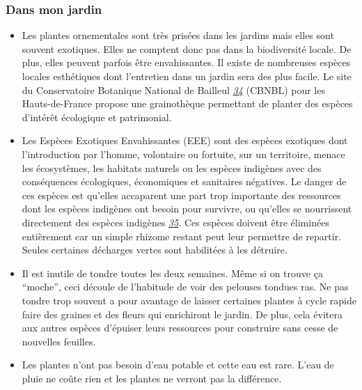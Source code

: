 \hypertarget{dans-mon-jardin}{%
\subsubsection{Dans mon jardin}\label{dans-mon-jardin}}

\begin{itemize}
\tightlist
\item
  Les plantes ornementales sont très prisées dans les jardins mais elles
  sont souvent exotiques. Elles ne comptent donc pas dans la
  biodiversité locale. De plus, elles peuvent parfois être
  envahissantes. Il existe de nombreuses espèces locales esthétiques
  dont l'entretien dans un jardin sera des plus facile. Le site du
  Conservatoire Botanique National de Bailleul
  \emph{\href{https://www.cbnbl.org/grainotheque}{34}} (CBNBL) pour les
  Hauts-de-France propose une grainothèque permettant de planter des
  espèces d'intérêt écologique et patrimonial.\\
\item
  Les Espèces Exotiques Envahissantes (EEE) sont des espèces exotiques
  dont l'introduction par l'homme, volontaire ou fortuite, sur un
  territoire, menace les écosystèmes, les habitats naturels ou les
  espèces indigènes avec des conséquences écologiques, économiques et
  sanitaires négatives. Le danger de ces espèces est qu'elles accaparent
  une part trop importante des ressources dont les espèces indigènes ont
  besoin pour survivre, ou qu'elles se nourrissent directement des
  espèces indigènes
  \emph{\href{https://www.ecologie.gouv.fr/especes-exotiques-envahissantes}{35}}.
  Ces espèces doivent être éliminées entièrement car un simple rhizome
  restant peut leur permettre de repartir. Seules certaines décharges
  vertes sont habilitées à les détruire.\\
\item
  Il est inutile de tondre toutes les deux semaines. Même si on trouve
  ça ``moche'', ceci découle de l'habitude de voir des pelouses tondues
  ras. Ne pas tondre trop souvent a pour avantage de laisser certaines
  plantes à cycle rapide faire des graines et des fleurs qui enrichiront
  le jardin. De plus, cela évitera aux autres espèces d'épuiser leurs
  ressources pour construire sans cesse de nouvelles feuilles.\\
\item
  Les plantes n'ont pas besoin d'eau potable et cette eau est rare.
  L'eau de pluie ne coûte rien et les plantes ne verront pas la
  différence.\\

\end{itemize}
